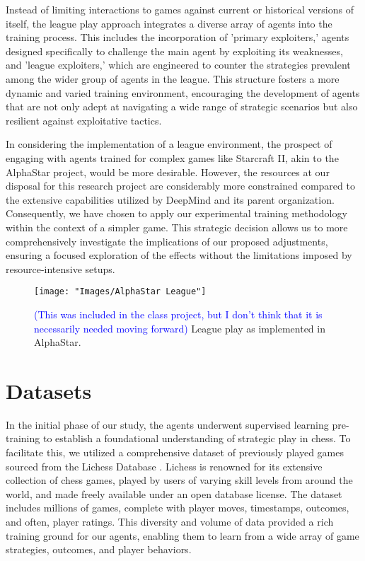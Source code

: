 \documentclass[journal]{IEEEtran}
\begin{document}
	Instead of limiting interactions to games against current or historical versions of itself, 
	the league play approach integrates a diverse array of agents into the training process. 
	This includes the incorporation of 'primary exploiters,' agents designed specifically to challenge the main agent by exploiting its weaknesses, 
	and 'league exploiters,' which are engineered to counter the strategies prevalent among the wider group of agents in the league. 
	This structure fosters a more dynamic and varied training environment, 
	encouraging the development of agents that are not only adept at navigating a wide range of strategic scenarios but also resilient against exploitative tactics.
	
	In considering the implementation of a league environment, the prospect of engaging with agents trained for complex games like Starcraft II, 
	akin to the AlphaStar project, would be more desirable. 
	However, the resources at our disposal for this research project are considerably more constrained compared to the 
	extensive capabilities utilized by DeepMind and its parent organization. 
	Consequently, we have chosen to apply our experimental training methodology within the context of a simpler game. 
	This strategic decision allows us to more comprehensively investigate the implications of our proposed adjustments, 
	ensuring a focused exploration of the effects without the limitations imposed by resource-intensive setups.
	
	\begin{figure}
		\centering
		\texttt{[image: "Images/AlphaStar League"]}
		\caption{\textcolor{blue}{(This was included in the class project, but I don't think that it is necessarily needed moving forward)} League play as implemented in AlphaStar.}
		\label{fig:alphastar-league}
	\end{figure}
	
	\begin{comment}		
	\end{comment}

	\begin{comment}
	\end{comment}
	\section{Datasets}
	\label{sec:dataset}
	In the initial phase of our study, the agents underwent supervised learning pre-training to establish a foundational understanding of strategic play in chess. 
	To facilitate this, we utilized a comprehensive dataset of previously played games sourced from the Lichess Database \cite{zotero-2247}.
	Lichess is renowned for its extensive collection of chess games, played by users of varying skill levels from around the world, 
	and made freely available under an open database license. 
	The dataset includes millions of games, complete with player moves, timestamps, outcomes, and often, player ratings. 
	This diversity and volume of data provided a rich training ground for our agents, enabling them to learn from a wide array of game strategies, outcomes, and player behaviors.
	
\end{document}

